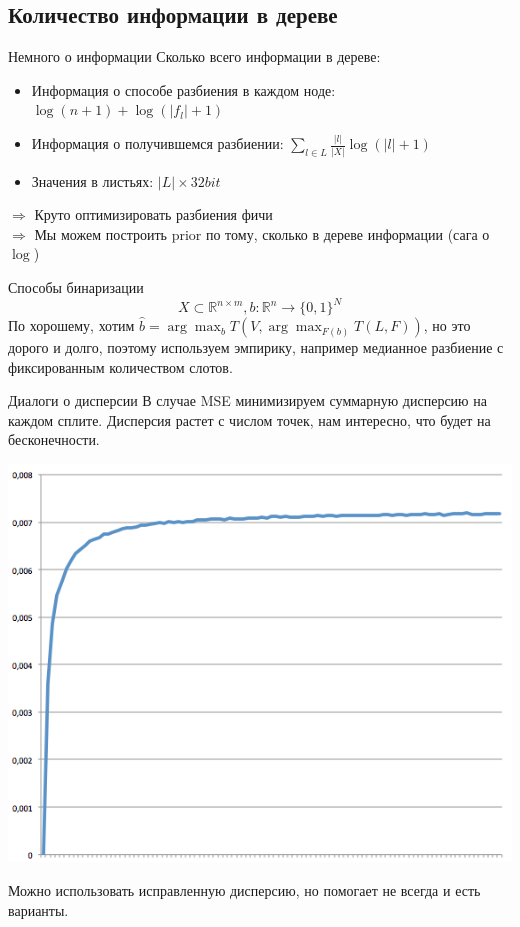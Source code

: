 \documentclass[14pt, fleqn, xcolor={dvipsnames, table}]{beamer}
\begin{document}
\subsection{Количество информации в дереве}

\begin{frame}{Немного о информации}
Сколько всего информации в дереве:
\begin{itemize}
  \item Информация о способе разбиения в каждом ноде: $\log(n + 1) + \log(|f_l| + 1)$
  \item Информация о получившемся разбиении: $\sum_{l \in L} \frac{|l|}{|X|} \log (|l| + 1)$
  \item Значения в листьях: $|L|\times32bit$
\end{itemize}
$\Rightarrow$ Круто оптимизировать разбиения фичи \\
$\Rightarrow$ Мы можем построить prior по тому, сколько в дереве информации (сага о $\log$)
\end{frame}

\begin{frame}{Способы бинаризации}
\small
$$
X \subset \mathbb{R}^{n\times m}, b: \mathbb{R}^n \to \{0,1\}^N
$$
По хорошему, хотим $\hat{b} = \arg \max_b T\left(V,\arg \max_{F(b)} T(L,F)\right)$, но это дорого и долго, поэтому используем эмпирику, например медианное разбиение с фиксированным количеством слотов.
\end{frame}

\begin{frame}{Диалоги о дисперсии}
\small
В случае MSE минимизируем суммарную дисперсию на каждом сплите. Дисперсия растет с числом точек, нам интересно, что будет на бесконечности.
\begin{center}
\includegraphics[height=0.5\textheight]{D.png} 
\end{center}
Можно использовать исправленную дисперсию, но помогает не всегда и есть варианты.
\end{frame}
\end{document}
